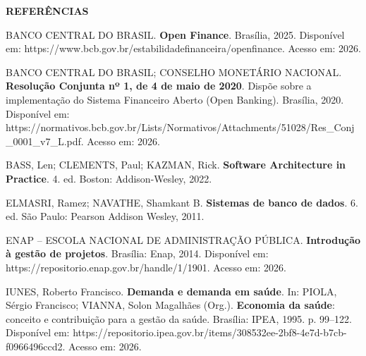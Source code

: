 \newpage
{}
\begin{sloppypar}
\setlength{\parindent}{0pt}

\begin{center}
    \fontsize{14pt}{14pt}\selectfont\bfseries REFERÊNCIAS\\[24pt]
\end{center}

BANCO CENTRAL DO BRASIL. \textbf{Open Finance}. Brasília, 2025. Disponível em: https://www.bcb.gov.br/estabilidadefinanceira/openfinance. Acesso em: 2026.

\vspace{0.4cm}

BANCO CENTRAL DO BRASIL; CONSELHO MONETÁRIO NACIONAL. \textbf{Resolução Conjunta nº 1, de 4 de maio de 2020}. Dispõe sobre a implementação do Sistema Financeiro Aberto (Open Banking). Brasília, 2020. Disponível em: https://normativos.bcb.gov.br/Lists/Normativos/Attachments/51028/Res\_Conj\_0001\_v7\_L.pdf. Acesso em: 2026.

\vspace{0.4cm}

BASS, Len; CLEMENTS, Paul; KAZMAN, Rick. \textbf{Software Architecture in Practice}. 4. ed. Boston: Addison-Wesley, 2022.

\vspace{0.4cm}

ELMASRI, Ramez; NAVATHE, Shamkant B. \textbf{Sistemas de banco de dados}. 6. ed. São Paulo: Pearson Addison Wesley, 2011.

\vspace{0.4cm}

ENAP -- ESCOLA NACIONAL DE ADMINISTRAÇÃO PÚBLICA. \textbf{Introdução à gestão de projetos}. Brasília: Enap, 2014. Disponível em: https://repositorio.enap.gov.br/handle/1/1901. Acesso em: 2026.

\vspace{0.4cm}

IUNES, Roberto Francisco. \textbf{Demanda e demanda em saúde}. In: PIOLA, Sérgio Francisco; VIANNA, Solon Magalhães (Org.). \textbf{Economia da saúde}: conceito e contribuição para a gestão da saúde. Brasília: IPEA, 1995. p. 99--122. Disponível em: https://repositorio.ipea.gov.br/items/308532ee-2bf8-4e7d-b7cb-f0966496ccd2. Acesso em: 2026.

\vspace{0.4cm}


\end{sloppypar}
